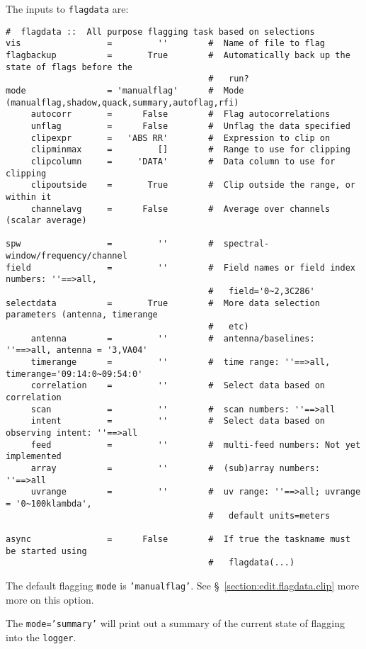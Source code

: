 The inputs to {\tt flagdata} are:
\small
\begin{verbatim}
#  flagdata ::  All purpose flagging task based on selections
vis                 =         ''        #  Name of file to flag
flagbackup          =       True        #  Automatically back up the state of flags before the
                                        #   run?
mode                = 'manualflag'      #  Mode (manualflag,shadow,quack,summary,autoflag,rfi)
     autocorr       =      False        #  Flag autocorrelations
     unflag         =      False        #  Unflag the data specified
     clipexpr       =   'ABS RR'        #  Expression to clip on
     clipminmax     =         []        #  Range to use for clipping
     clipcolumn     =     'DATA'        #  Data column to use for clipping
     clipoutside    =       True        #  Clip outside the range, or within it
     channelavg     =      False        #  Average over channels (scalar average)

spw                 =         ''        #  spectral-window/frequency/channel
field               =         ''        #  Field names or field index numbers: ''==>all,
                                        #   field='0~2,3C286'
selectdata          =       True        #  More data selection parameters (antenna, timerange
                                        #   etc)
     antenna        =         ''        #  antenna/baselines: ''==>all, antenna = '3,VA04'
     timerange      =         ''        #  time range: ''==>all, timerange='09:14:0~09:54:0'
     correlation    =         ''        #  Select data based on correlation
     scan           =         ''        #  scan numbers: ''==>all
     intent         =         ''        #  Select data based on observing intent: ''==>all
     feed           =         ''        #  multi-feed numbers: Not yet implemented
     array          =         ''        #  (sub)array numbers: ''==>all
     uvrange        =         ''        #  uv range: ''==>all; uvrange = '0~100klambda',
                                        #   default units=meters

async               =      False        #  If true the taskname must be started using
                                        #   flagdata(...)
\end{verbatim}
\normalsize

The default flagging {\tt mode} is {\tt 'manualflag'}.  See 
\S~\ref{section:edit.flagdata.clip} more more on this option.

The {\tt mode='summary'} will print out a summary of the current
state of flagging into the {\tt logger}.

